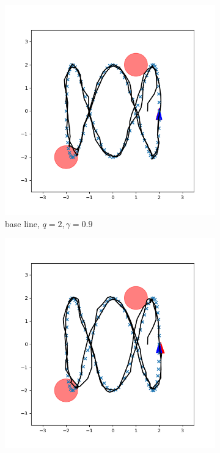 \documentclass[conference]{IEEEtran}
\begin{document}
\begin{figure}[h]
    \centering
    \begin{subfigure}[b]{0.3\textwidth}
        \includegraphics[width=\textwidth]{../fig/trajectory.cec.png}
        \caption{base line, $q=2, \gamma=0.9$}
        \label{fig:base}
        \end{subfigure}
    \hfill
    \begin{subfigure}[b]{0.3\textwidth}
        \includegraphics[width=\textwidth]{../fig/trajectory.cec.q_0.png}

\end{subfigure}
\end{figure}
\end{document}
